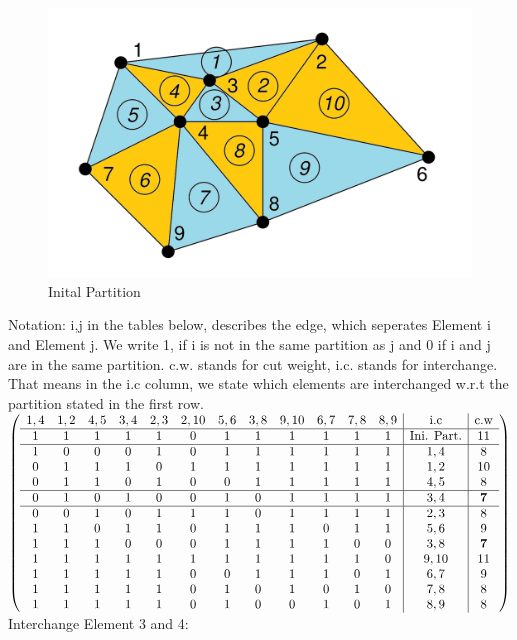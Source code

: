 \documentclass{article}
\begin{document}
\begin{enumerate}[label=(\alph*)]
    \begin{figure}[h]
    \centering
     \includegraphics[scale=0.3]{erste Zerlegung}
    \caption{Inital Partition}
    \label{fig:meine-grafik}
    \end{figure}
Notation: i,j in the tables below, describes the edge, which seperates Element i and Element j. We write 1, if i is not in the same partition as j and 0 if i and j are in the same partition. c.w. stands for cut weight,  i.c. stands for interchange. That means in the i.c column, we state which elements are interchanged w.r.t the partition stated in the first row.
\newline
$\left(
 \begin{array}{cccccccccccc|c | c}
            1, 4 & 1, 2 & 4,5 & 3, 4 & 2, 3 & 2, 10 & 5, 6 & 3, 8 & 9,10 & 6, 7 & 7, 8 & 8,9 & \text{i.c} & \text{c.w}\\
	\hline
            1 & 1 & 1 & 1 & 1 & 0 & 1 & 1 & 1 & 1 & 1 & 1 & \text{Ini. Part.} & 11\\
	\hline
            1 & 0 & 0 & 0 & 1 & 0 & 1 & 1 & 1 & 1 & 1 & 1 &  1,4  & 8\\
	 0 & 1 & 1 & 1 & 0 & 1 & 1 & 1 & 1 & 1 & 1 & 1 &  1,2 & 10\\
 	0 & 1 & 1 & 0 & 1 & 0 & 0 & 1 & 1 & 1 & 1 & 1 &  4, 5 & 8\\
	\hline
	 0 & 1 & 0 & 1 & 0 & 0 & 1 & 0 & 1 & 1 & 1 & 1 &  3, 4 & \textbf{7}\\
	\hline
 	0 & 0 & 1 & 0 & 1 & 1 & 1 & 0 & 1 & 1 & 1 & 1 &  2, 3 & 8\\
	1 & 1 & 0 & 1 & 1 & 0 & 1 & 1 & 1 & 0 & 1 & 1 &  5, 6 & 9\\
	1 & 1 & 1 & 0 & 0 & 0 & 1 & 1 & 1 & 1 & 0 & 0 &  3, 8 & \textbf{7}\\
	1 & 1 & 1 & 1 & 1 & 1 & 1 & 1 & 1 & 1 & 1 & 0 &  9, 10 & 11\\
	1 & 1 & 1 & 1 & 1 & 0 & 0 & 1 & 1 & 1 & 0 & 1 &  6, 7 & 9\\
	1 & 1 & 1 & 1 & 1 & 0 & 1 & 0 & 1 & 0 & 1 & 0 &  7,8 & 8\\
	1 & 1 & 1 & 1 & 1 & 0 & 1 & 0 & 0 & 1 & 0 & 1 & 8, 9 & 8\\
   \end{array}
\right)$
\newline
Interchange Element 3 and 4:


\end{enumerate}
\end{document}
